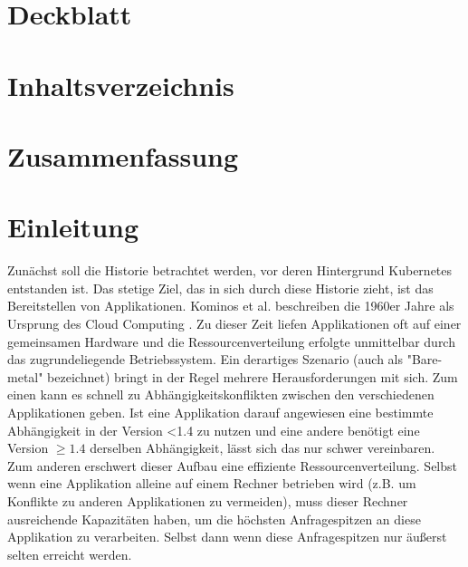 \documentclass[11pt,a4paper]{article}
\begin{document}
\section{Deckblatt}
\section{Inhaltsverzeichnis}



\section{Zusammenfassung}

\section{Einleitung}

Zunächst soll die Historie betrachtet werden, vor deren Hintergrund Kubernetes entstanden ist.
Das stetige Ziel, das in sich durch diese Historie zieht, ist das Bereitstellen von Applikationen.
Kominos et al. beschreiben die 1960er Jahre als Ursprung des Cloud Computing \cite{7899247}.
Zu dieser Zeit liefen Applikationen oft auf einer gemeinsamen Hardware und die Ressourcenverteilung erfolgte unmittelbar durch das zugrundeliegende Betriebssystem.
Ein derartiges Szenario (auch als "Bare-metal" bezeichnet) bringt in der Regel mehrere Herausforderungen mit sich.
Zum einen kann es schnell zu Abhängigkeitskonflikten zwischen den verschiedenen Applikationen geben.
Ist eine Applikation darauf angewiesen eine bestimmte Abhängigkeit in der Version <1.4 zu nutzen und eine andere
benötigt eine Version \(\geq 1.4\) derselben Abhängigkeit, lässt sich das nur schwer vereinbaren.
Zum anderen erschwert dieser Aufbau eine effiziente Ressourcenverteilung. Selbst wenn eine Applikation alleine auf einem Rechner betrieben wird (z.B. um Konflikte zu anderen
Applikationen zu vermeiden), muss dieser Rechner ausreichende Kapazitäten haben, um die höchsten Anfragespitzen an diese Applikation zu verarbeiten.
Selbst dann wenn diese Anfragespitzen nur äußerst selten erreicht werden.
\end{document}

